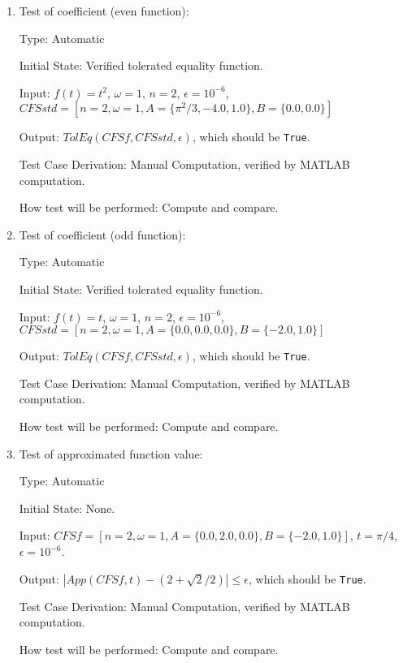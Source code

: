 \documentclass[12pt, titlepage]{article}
\newcommand{\li}[1]{\texttt{#1}}
\begin{document}
\begin{enumerate}
	\item{Test of coefficient (even function):\\}
	
	Type: Automatic
	
	Initial State: Verified tolerated equality function.
	
	Input: $f(t)=t^2$, $\omega=1$, $n=2$, $\epsilon=10^{-6}$, $\mathit{CFSstd}=[n=2,\omega=1, A=\{\pi^2/3, -4.0, 1.0\}, B=\{0.0, 0.0\}]$
	
	Output: $\mathit{TolEq}(\mathit{CFSf}, \mathit{CFSstd}, \epsilon)$, which should be \li{True}.
	
	Test Case Derivation: Manual Computation, verified by MATLAB computation.
	
	How test will be performed: Compute and compare.
	
	\item{Test of coefficient (odd function):\\}
	
	Type: Automatic	
	
	Initial State: Verified tolerated equality function.
	
	Input: $f(t)=t$, $\omega=1$, $n=2$, $\epsilon=10^{-6}$, $\mathit{CFSstd}=[n=2,\omega=1, A=\{0.0, 0.0, 0.0\}, B=\{-2.0, 1.0\}]$
	
	Output: $\mathit{TolEq}(\mathit{CFSf}, \mathit{CFSstd}, \epsilon)$, which should be \li{True}.
	
	Test Case Derivation: Manual Computation, verified by MATLAB computation.
	
	How test will be performed: Compute and compare.
	
	\item{Test of approximated function value: \\}
	
	Type: Automatic
	
	Initial State: None.
	
	Input: $\mathit{CFSf}=[n=2,\omega=1, A=\{0.0, 2.0, 0.0\}, B=\{-2.0, 1.0\}]$, $t=\pi/4$, $\epsilon=10^{-6}$.
	
	Output: $|\mathit{App}(\mathit{CFSf}, t)-(2+\sqrt{2}/2)|\leq\epsilon$, which should be \li{True}.
	
	Test Case Derivation: Manual Computation, verified by MATLAB computation.
	
	How test will be performed: Compute and compare.
	
\end{enumerate}
\end{document}
